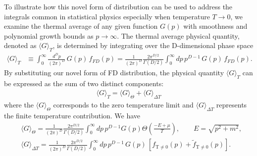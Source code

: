 \documentclass[sn-mathphys,Numbered]{sn-jnl}
\newcommand{\req}[1]{Eq.\,(\ref{#1})}
\newcommand*{\xgreen}{\color{green}}
\begin{document}

To illustrate how this novel form of distribution can be used to address the integrals common in statistical physics especially when temperature $T\to0$, we examine the thermal average of any given function $G(p)$ with smoothness and polynomial growth bounds as $p\to \infty$. The thermal average physical quantity, denoted as $\langle G\rangle_T$, is determined by integrating over the D-dimensional phase space 
\begin{align}\label{eq:avg_G_T}
\langle G\rangle_T&\equiv\int^{\infty}_{0}\!\!\frac{d^Dp}{(2\pi)^D}\,G(p)\,f_{FD}(p)=\frac{1}{(2\pi)^D}\frac{2\pi^{D/2}}{\Gamma(D/2)}\int^{\infty}_{0}\!\!dp\,p^{D-1}\,G(p)\,f_{FD}(p).
\end{align}
By substituting our novel form of FD distribution, the physical quantity $\langle G\rangle_T$ can be expressed as the sum of two distinct components:
\begin{align}
\langle G\rangle_T=\langle G\rangle_{\Theta}+\langle G\rangle_{\Delta T}
\end{align}
 where the $\langle G\rangle_{\Theta}$ corresponds to the zero temperature limit and $\langle G\rangle_{\Delta T}$ represents the finite temperature contribution. We have
\begin{align}
&\langle G\rangle_{\Theta}=\frac{1}{(2\pi)^D}\frac{2\pi^{D/2}}{\Gamma(D/2)}\int^{\infty}_{0}\!\!dp\,p^{D-1}G(p)\Theta\left(\frac{-E+\mu}{T}\right),\qquad E=\sqrt{p^2+m^2},\\
&\langle G\rangle_{\Delta T}=\frac{1}{(2\pi)^D}\frac{2\pi^{D/2}}{\Gamma(D/2)}\int^{\infty}_{0}\!\!dp\,p^{D-1}\,G(p)\,\left[f_\mathrm{T\neq0}(p)+\widetilde f_\mathrm{T\neq0}(p)\right].\label{G_deltaT}
\end{align}
\end{document}
